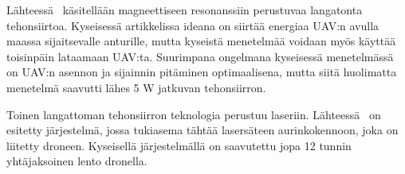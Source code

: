 Lähteessä~\cite{Griffin2012} käsitellään magneettiseen resonanssiin perustuvaa
langatonta tehonsiirtoa. Kyseisessä artikkelissa ideana on siirtää energiaa
UAV:n avulla maassa sijaitsevalle anturille, mutta kyseistä menetelmää
voidaan myös käyttää toisinpäin lataamaan UAV:ta. Suurimpana ongelmana
kyseisessä menetelmässä on UAV:n asennon ja sijainnin pitäminen optimaalisena,
mutta siitä huolimatta menetelmä saavutti lähes 5 W jatkuvan tehonsiirron.

Toinen langattoman tehonsiirron teknologia perustuu laseriin.
Lähteessä~\cite{Achtelik2011} on esitetty järjestelmä, jossa tukiasema tähtää
lasersäteen aurinkokennoon, joka on liitetty droneen. Kyseisellä järjestelmällä
on saavutettu jopa 12 tunnin yhtäjaksoinen lento dronella.
